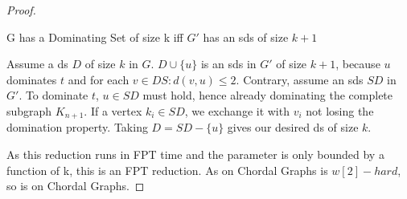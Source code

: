 \begin{proof}
    \begin{corollary}
    G has a Dominating Set of size k iff $G'$ has an sds of size $k+1$
    \end{corollary}
    \begin{subproof}
    Assume a ds $D$ of size $k$ in $G$. $D \cup \{u\}$ is an sds in $G'$ of size $k + 1$, because $u$ dominates $t$ and for each $v \in DS: d(v, u) \leq 2$.
    Contrary, assume an sds $SD$ in $G'$. To dominate $t$, $u \in SD$ must hold, hence already dominating the complete subgraph $K_{n+1}$. If a vertex $k_i \in SD$, we exchange it with $v_i$ not losing the domination property. Taking $D = SD - \{ u \}$ gives our desired ds of size $k$.
    \end{subproof}
    As this reduction runs in FPT time and the parameter is only bounded by a function of k, this is an FPT reduction. As \dom on Chordal Graphs is $w[2]-hard$, so is \sdom on Chordal Graphs.
\end{proof}
